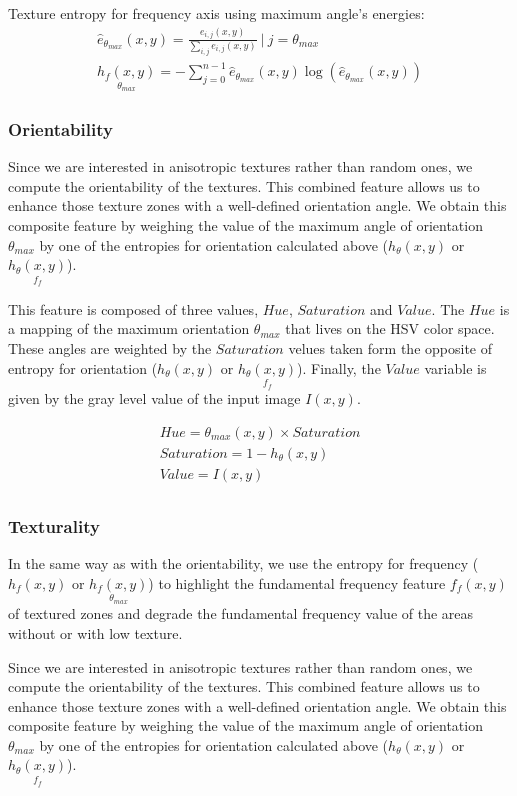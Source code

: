 Texture entropy for frequency axis using maximum angle's energies:
\begin{gather}
    \hat{e}_{\theta _{max}}(x,y) = \frac{e_{i,j}(x,y)}{ \sum_{i,j} e_{i,j}(x,y)} ~|~ j = \theta _{max}\\	
    \underset{\theta_{max}}{h_{f}(x,y)} = -\sum_{j=0}^{n-1} \hat{e}_{\theta _{max}}(x,y)  \log (\hat{e}_{\theta _{max}}(x,y))  \label{eq:entropy_ang_max}
\end{gather}

\subsubsection{Orientability}
Since we are interested in anisotropic textures rather than random ones, we compute the orientability of the textures. This combined feature allows us to enhance those texture zones with a well-defined orientation angle.
We obtain this composite feature by weighing the value of the maximum angle of orientation $\theta_{max}$ by one of the entropies for orientation calculated above ($h_{\theta}(x,y)$ or $\underset{f_{f}}{h_{\theta}(x,y)}$).

This feature is composed of three values, $Hue$, $Saturation$ and $Value$. The $Hue$ is a mapping of the maximum orientation $\theta_{max}$ that lives on the HSV color space. These angles are weighted by the $Saturation$ velues taken form the opposite of entropy for orientation ($h_{\theta}(x,y)$ or $\underset{f_{f}}{h_{\theta}(x,y)}$). Finally, the $Value$ variable is given by the gray level value of the input image $I(x,y)$.

\begin{gather}
    Hue = \theta_{max}(x,y) \times Saturation \\
    Saturation = 1 - h_{\theta} (x,y) \\
    Value = I(x,y) \\
\end{gather}

\subsubsection{Texturality}
In the same way as with the orientability, we use the entropy for frequency ($h_{f}(x,y)$ or $\underset{\theta_{max}}{h_{f}(x,y)}$) to highlight the fundamental frequency feature $f_f(x,y)$ of textured zones and degrade the fundamental frequency value of the areas without or with low texture.

Since we are interested in anisotropic textures rather than random ones, we compute the orientability of the textures. This combined feature allows us to enhance those texture zones with a well-defined orientation angle.
We obtain this composite feature by weighing the value of the maximum angle of orientation $\theta_{max}$ by one of the entropies for orientation calculated above ($h_{\theta}(x,y)$ or $\underset{f_{f}}{h_{\theta}(x,y)}$).

